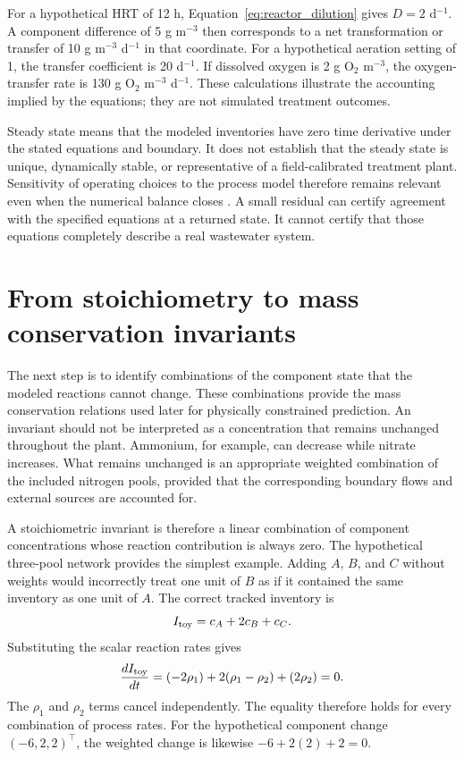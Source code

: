 For a hypothetical HRT of 12 h, Equation~\eqref{eq:reactor_dilution} gives $D=2$ d$^{-1}$. A component difference of 5 g m$^{-3}$ then corresponds to a net transformation or transfer of 10 g m$^{-3}$ d$^{-1}$ in that coordinate. For a hypothetical aeration setting of 1, the transfer coefficient is 20 d$^{-1}$. If dissolved oxygen is 2 g O$_2$ m$^{-3}$, the oxygen-transfer rate is 130 g O$_2$ m$^{-3}$ d$^{-1}$. These calculations illustrate the accounting implied by the equations; they are not simulated treatment outcomes.

Steady state means that the modeled inventories have zero time derivative under the stated equations and boundary. It does not establish that the steady state is unique, dynamically stable, or representative of a field-calibrated treatment plant. Sensitivity of operating choices to the process model therefore remains relevant even when the numerical balance closes \citep{Araujo2013}. A small residual can certify agreement with the specified equations at a returned state. It cannot certify that those equations completely describe a real wastewater system.

\section{From stoichiometry to mass conservation invariants}

The next step is to identify combinations of the component state that the modeled reactions cannot change. These combinations provide the mass conservation relations used later for physically constrained prediction. An invariant should not be interpreted as a concentration that remains unchanged throughout the plant. Ammonium, for example, can decrease while nitrate increases. What remains unchanged is an appropriate weighted combination of the included nitrogen pools, provided that the corresponding boundary flows and external sources are accounted for.

A stoichiometric invariant is therefore a linear combination of component concentrations whose reaction contribution is always zero. The hypothetical three-pool network provides the simplest example. Adding $A$, $B$, and $C$ without weights would incorrectly treat one unit of $B$ as if it contained the same inventory as one unit of $A$. The correct tracked inventory is
\[
I_{\rm toy}=c_A+2c_B+c_C.
\]
Substituting the scalar reaction rates gives
\[
\frac{d I_{\rm toy}}{dt}
=(-2\rho_1)+2(\rho_1-\rho_2)+(2\rho_2)=0.
\]
The $\rho_1$ and $\rho_2$ terms cancel independently. The equality therefore holds for every combination of process rates. For the hypothetical component change $(-6,2,2)^\top$, the weighted change is likewise $-6+2(2)+2=0$.

